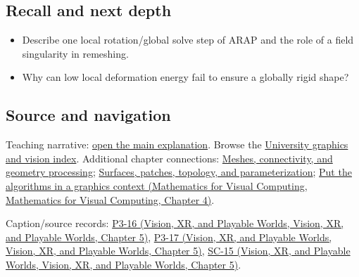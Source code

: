 \subsection{Recall and next depth}\label{appendix-7107009c505b-recall-and-next-depth}

\begin{itemize}
\tightlist
\item
  Describe one local rotation/global solve step of ARAP and the role of a field singularity in remeshing.
\item
  Why can low local deformation energy fail to ensure a globally rigid shape?
\end{itemize}

\subsection{Source and navigation}\label{appendix-7107009c505b-source-and-navigation}

Teaching narrative: \hyperref[03-visual-computing-i-ch002-meshes-connectivity-and-geometry-processing]{open the main explanation}. Browse the \hyperref[appendix-a6d556a4ef50-university-graphics-vision-and-photography---independent-series]{University graphics and vision index}. Additional chapter connections: \hyperref[03-visual-computing-i-ch002-meshes-connectivity-and-geometry-processing]{Meshes, connectivity, and geometry processing}; \hyperref[03-visual-computing-i-ch002-surfaces-patches-topology-and-parameterization]{Surfaces, patches, topology, and parameterization}; \href{../02-Mathematics-for-Visual-Computing/main.pdf\#nameddest=01-foundations-i-ch020-put-the-algorithms-in-a-graphics-context}{Put the algorithms in a graphics context (Mathematics for Visual Computing, Mathematics for Visual Computing, Chapter 4)}.

Caption/source records: \href{../07-Vision-XR-and-Playable-Worlds/main.pdf\#nameddest=04-visual-computing-ii-ch036-p3-16---subdivision-surfaces-part-1}{P3-16 (Vision, XR, and Playable Worlds, Vision, XR, and Playable Worlds, Chapter 5)}, \href{../07-Vision-XR-and-Playable-Worlds/main.pdf\#nameddest=04-visual-computing-ii-ch036-p3-17---subdivision-surfaces-part-2}{P3-17 (Vision, XR, and Playable Worlds, Vision, XR, and Playable Worlds, Chapter 5)}, \href{../07-Vision-XR-and-Playable-Worlds/main.pdf\#nameddest=04-visual-computing-ii-ch036-sc-15---stanford-cs231n-deep-learning-for-computer-vision-spring-2025-lecture-15-3d-vision}{SC-15 (Vision, XR, and Playable Worlds, Vision, XR, and Playable Worlds, Chapter 5)}.

